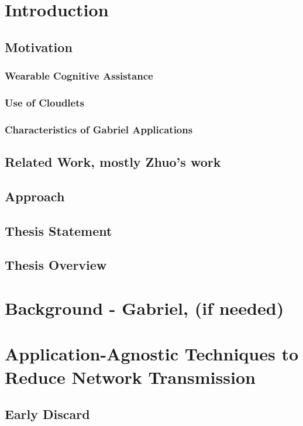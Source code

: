 \documentclass[12pt,openany]{cmuthesis}
\begin{document}
\section{Introduction}
\subsection{Motivation}
\subsubsection{Wearable Cognitive Assistance}
\subsubsection{Use of Cloudlets}
\subsubsection{Characteristics of Gabriel Applications}
\subsection{Related Work, mostly Zhuo's work}
\subsection{Approach}
\subsection{Thesis Statement}
\subsection{Thesis Overview}

\section{Background - Gabriel, (if needed)}

\section{Application-Agnostic Techniques to Reduce Network Transmission}
\subsection{Early Discard}
\end{document}
